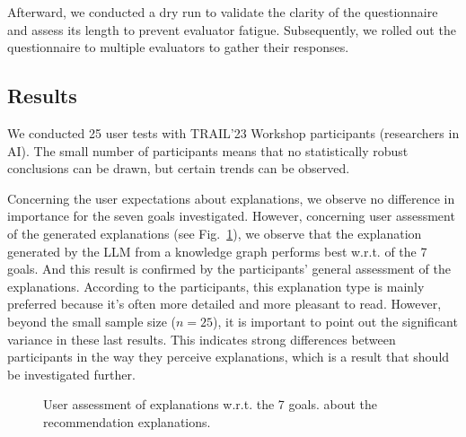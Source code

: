 Afterward, we conducted a dry run to validate the clarity of the questionnaire and assess its length to prevent evaluator fatigue. Subsequently, we rolled out the questionnaire to multiple evaluators to gather their responses.

\subsection{Results}

We conducted 25 user tests with TRAIL'23 Workshop participants (researchers in AI). The small number of participants means that no statistically robust conclusions can be drawn, but certain trends can be observed.

%     

Concerning the user expectations about explanations, we observe no difference in importance for the seven goals investigated. However, concerning user assessment of the generated explanations (see Fig.~\ref{fig:ResultsExplanation}), we observe that the explanation generated by the LLM from a knowledge graph performs best w.r.t. of the 7 goals. And this result is confirmed by the participants' general assessment of the explanations. According to the participants, this explanation type is mainly preferred because it's often more detailed and more pleasant to read.
However, beyond the small sample size ($n = 25$), it is important to point out the significant variance in these last results. This indicates strong differences between participants in the way they perceive explanations, which is a result that should be investigated further.

\begin{figure}[!ht]
    \centering
    
    \caption{User assessment of explanations w.r.t. the 7 goals. about the recommendation explanations.}
    \label{fig:ResultsExplanation}
\end{figure}

